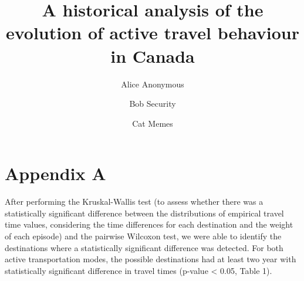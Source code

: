 \documentclass[preprint, 3p,
authoryear]{elsarticle} %
\begin{document}
\begin{frontmatter}

  \title{A historical analysis of the evolution of active travel
behaviour in Canada}
    \author[Some Institute of Technology]{Alice Anonymous%
  }
    \author[Some Institute of Technology]{Bob Security%
  }
    \author[Some Institute of Technology]{Cat Memes%
  }
  
  \begin{abstract}
  
  \end{abstract}
  
 \end{frontmatter}

\section*{Appendix A}\label{appendix-a}

After performing the Kruskal-Wallis test (to assess whether there was a
statistically significant difference between the distributions of
empirical travel time values, considering the time differences for each
destination and the weight of each episode) and the pairwise Wilcoxon
test, we were able to identify the destinations where a statistically
significant difference was detected. For both active transportation
modes, the possible destinations had at least two year with
statistically significant difference in travel times (p-value
\textless{} 0.05, Table 1).
\end{document}
